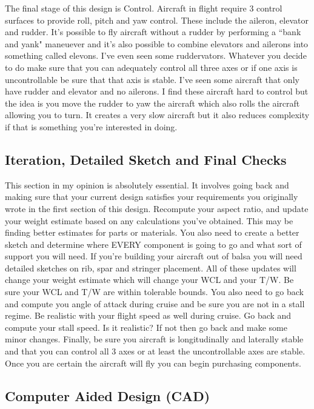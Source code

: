 \documentclass{article}
\begin{document}
The final stage of this design is Control. Aircraft in flight require
3 control surfaces to provide roll, pitch and yaw control. These
include the aileron, elevator and rudder. It's possible to fly
aircraft without a rudder by performing a ``bank and yank" maneuever
and it's also possible to combine elevators and ailerons into
something called elevons. I've even seen some ruddervators. Whatever
you decide to do make sure that you can adequately control all three
axes or if one axis is uncontrollable be sure that that axis is
stable. I've seen some aircraft that only have rudder and elevator and
no ailerons. I find these aircraft hard to control but the idea is you
move the rudder to yaw the aircraft which also rolls the aircraft
allowing you to turn. It creates a very slow aircraft but it also
reduces complexity if that is something you're interested in doing. 

\subsection{Iteration, Detailed Sketch and Final Checks}

This section in my opinion is absolutely essential. It involves going
back and making sure that your current design satisfies your
requirements you originally wrote in the first section of this
design. Recompute your aspect ratio, and update your weight estimate
based on any calculations you've obtained. This may be finding better
estimates for parts or materials. You also need to create a better
sketch and determine where EVERY component is going to go and what
sort of support you will need. If you're building your aircraft out of
balsa you will need detailed sketches on rib, spar and stringer
placement. All of these updates will change your weight estimate which
will change your WCL and your T/W. Be sure your WCL and T/W are within
tolerable bounds. You also need to go back and compute you angle of
attack during cruise and be sure you are not in a stall regime. Be
realistic with your flight speed as well during cruise. Go back and
compute your stall speed. Is it realistic? If not then go back and
make some minor changes. Finally, be sure you aircraft is
longitudinally and laterally stable and that you can control all 3
axes or at least the uncontrollable axes are stable. Once you are
certain the aircraft will fly you can begin purchasing components. 

\subsection{Computer Aided Design (CAD)}
\end{document}
